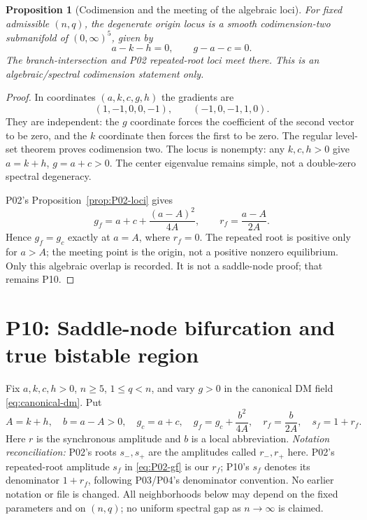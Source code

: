 \documentclass[11pt]{article}
\newtheorem{proposition}[theorem]{Proposition}
\theoremstyle{definition}
\theoremstyle{remark}
\begin{document}
\begin{proposition}[Codimension and the meeting of the algebraic loci]
\label{prop:P09-codimension}
For fixed admissible $(n,q)$, the degenerate origin locus is a smooth
codimension-two submanifold of $(0,\infty)^5$, given by
\begin{equation}
 a-k-h=0,\qquad g-a-c=0.\label{eq:P09-degenerate-locus}
\end{equation}
The branch-intersection and P02 repeated-root loci meet there.
This is an algebraic/spectral codimension statement only.
\end{proposition}
\begin{proof}
In coordinates $(a,k,c,g,h)$ the gradients are
\[
 (1,-1,0,0,-1),\qquad(-1,0,-1,1,0).
\]
They are independent: the $g$ coordinate forces the coefficient of
the second vector to be zero, and the $k$ coordinate then forces the
first to be zero. The regular level-set theorem proves codimension two.
The locus is nonempty: any $k,c,h>0$ give $a=k+h$, $g=a+c>0$.
The center eigenvalue remains simple, not a double-zero spectral
 degeneracy.

P02's Proposition~\ref{prop:P02-loci} gives
\[
 g_f=a+c+\frac{(a-A)^2}{4A},\qquad r_f=\frac{a-A}{2A}.
\]
Hence $g_f=g_c$ exactly at $a=A$, where $r_f=0$.
The repeated root is positive only for $a>A$; the meeting point is
the origin, not a positive nonzero equilibrium. Only this algebraic
overlap is recorded. It is not a saddle-node proof; that remains P10.
\end{proof}


\section{P10: Saddle-node bifurcation and true bistable region}
\label{sec:P10}

Fix $a,k,c,h>0$, $n\ge5$, $1\le q<n$, and vary $g>0$ in the
canonical DM field \eqref{eq:canonical-dm}. Put
\begin{equation}
 A=k+h,\quad b=a-A>0,\quad g_c=a+c,\quad
 g_f=g_c+\frac{b^2}{4A},\quad r_f=\frac b{2A},\quad s_f=1+r_f.
 \label{eq:P10-data}
\end{equation}
Here $r$ is the synchronous amplitude and $b$ is a local abbreviation.
\emph{Notation reconciliation:} P02's roots $s_-,s_+$ are the amplitudes
called $r_-,r_+$ here. P02's repeated-root amplitude $s_f$ in
\eqref{eq:P02-gf} is our $r_f$; P10's $s_f$ denotes its denominator
$1+r_f$, following P03/P04's denominator convention. No earlier notation
or file is changed. All neighborhoods below may depend on the fixed
parameters and on $(n,q)$; no uniform spectral gap as $n\to\infty$ is claimed.
\end{document}
